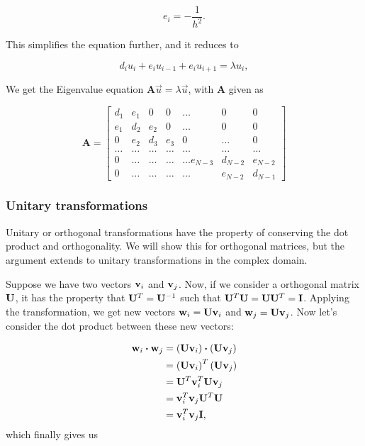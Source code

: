\documentclass{emulateapj}
\begin{document}
\begin{equation}
   e_i=-\frac{1}{h^2}.
\end{equation}

This simplifies the equation further, and it reduces to

\begin{equation}
d_iu_i+e_{i}u_{i-1}+e_{i}u_{i+1}  = \lambda u_i,
\end{equation}

We get the Eigenvalue equation $\mathbf{A}\vec{u} = \lambda \vec{u}$, with $\mathbf{A}$ given as

\begin{equation}
    \mathbf{A} =
    \begin{bmatrix}d_1 & e_1 & 0   & 0    & \dots  &0     & 0 \\
                                e_1 & d_2 & e_2 & 0    & \dots  &0     &0 \\
                                0   & e_2 & d_3 & e_3  &0       &\dots & 0\\
                                \dots  & \dots & \dots & \dots  &\dots      &\dots & \dots\\
                                0   & \dots & \dots & \dots  &\dots  e_{N-3}     &d_{N-2} & e_{N-2}\\
                                0   & \dots & \dots & \dots  &\dots       &e_{N-2} & d_{N-1}
             \end{bmatrix}
      \label{eq:sematrix}
\end{equation}

\subsubsection{Unitary transformations}
Unitary or orthogonal transformations have the property of conserving the dot product and orthogonality. We will show this for orthogonal matrices, but the argument extends to unitary transformations in the complex domain.

Suppose we have two vectors $\bold{v}_i$ and $\bold{v}_j$. Now, if we consider a orthogonal matrix $\bold{U}$, it has the property that $\bold{U}^T = \bold{U}^{-1}$ such that $\bold{U}^T\bold{U} = \bold{U}\bold{U}^T = \bold{I}$. Applying the transformation, we get new vectors $\bold{w}_i = \bold{U}\bold{v}_i$ and $ \bold{w}_j = \bold{U}\bold{v}_j$.
Now let's consider the dot product between these new vectors:

\begin{align*}
	\bold{w}_i \boldsymbol{\cdot} \bold{w}_j &= \left(\bold{U}\bold{v}_i\right) \boldsymbol{\cdot} \left(\bold{U}\bold{v}_j\right) \\
	&= \left(\bold{U}\bold{v}_i\right)^T \left(\bold{U}\bold{v}_j\right) \\
	&= \bold{U}^T \bold{v}_i^T \bold{U}\bold{v}_j \\
	&= \bold{v}_i^T  \bold{v}_j \bold{U}^T \bold{U} \\
	&= \bold{v}_i^T  \bold{v}_j \bold{I},
\end{align*}
which finally gives us
\end{document}

